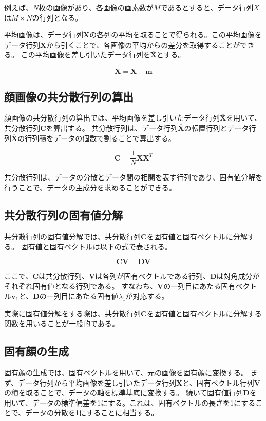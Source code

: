 \documentclass[a4paper,11pt,dvipdfmx]{jsarticle}
\begin{document}
例えば、$N$枚の画像があり、各画像の画素数が$M$であるとすると、データ行列$X$は$M \times N$の行列となる。

平均画像は、データ行列$\mathbf{X}$の各列の平均を取ることで得られる。この平均画像をデータ行列$\mathbf{X}$から引くことで、各画像の平均からの差分を取得することができる。
この平均画像を差し引いたデータ行列を$\overline{\mathbf{X}}$とする。

\begin{equation}
    \overline{\mathbf{X}} = \mathbf{X} - \mathbf{m}
\end{equation}

\subsection{顔画像の共分散行列の算出}
顔画像の共分散行列の算出では、平均画像を差し引いたデータ行列$\overline{\mathbf{X}}$を用いて、共分散行列$\mathbf{C}$を算出する。
共分散行列は、データ行列$\overline{\mathbf{X}}$の転置行列とデータ行列$\overline{\mathbf{X}}$の行列積をデータの個数で割ることで算出する。

\begin{equation}
    \mathbf{C} = \frac{1}{N} \overline{\mathbf{X}} \mathbf{X}^T
\end{equation}

共分散行列は、データの分散とデータ間の相関を表す行列であり、固有値分解を行うことで、データの主成分を求めることができる。

\subsection{共分散行列の固有値分解}
共分散行列の固有値分解では、共分散行列$\mathbf{C}$を固有値と固有ベクトルに分解する。
固有値と固有ベクトルは以下の式で表される。

\begin{equation}
    \mathbf{C} \mathbf{V} = \mathbf{D} \mathbf{V}
\end{equation}

ここで、$\mathbf{C}$は共分散行列、$\mathbf{V}$は各列が固有ベクトルである行列、$\mathbf{D}$は対角成分がそれぞれ固有値となる行列である。
すなわち、$\mathbf{V}$の一列目にあたる固有ベクトル$\mathbf{v_1}$と、$\mathbf{D}$の一列目にあたる固有値$\lambda_1$が対応する。

実際に固有値分解をする際は、共分散行列$\mathbf{C}$を固有値と固有ベクトルに分解する関数を用いることが一般的である。

\subsection{固有顔の生成}
固有顔の生成では、固有ベクトルを用いて、元の画像を固有顔に変換する。
まず、データ行列から平均画像を差し引いたデータ行列$\overline{\mathbf{X}}$と、固有ベクトル行列$\mathbf{V}$の積を取ることで、データの軸を標準基底に変換する。
続いて固有値行列$\mathbf{D}$を用いて、データの標準偏差を1にする。これは、固有ベクトルの長さを1にすることで、データの分散を1にすることに相当する。
\end{document}
